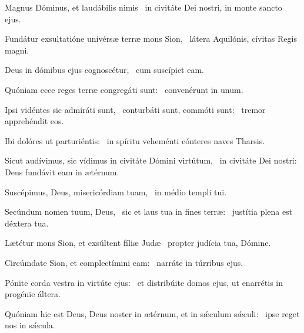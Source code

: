 \item Magnus Dóminus, et laudábilis nimis~\psstar{} in civitáte Dei nostri, in monte sancto ejus.

\item Fundátur exsultatióne univérsæ terræ mons Sion,~\psstar{} látera Aquilónis, cívitas Regis magni.

\item Deus in dómibus ejus cognoscétur,~\psstar{} cum suscípiet eam.

\item Quóniam ecce reges terræ congregáti sunt:~\psstar{} convenérunt in unum.

\item Ipsi vidéntes sic admiráti sunt,~\pscross{} conturbáti sunt, commóti sunt:~\psstar{} tremor apprehéndit eos.

\item Ibi dolóres ut parturiéntis:~\psstar{} in spíritu veheménti cónteres naves Tharsis.

\item Sicut audívimus, sic vídimus in civitáte Dómini virtútum,~\pscross{} in civitáte Dei nostri:~\psstar{} Deus fundávit eam in ætérnum.

\item Suscépimus, Deus, misericórdiam tuam,~\psstar{} in médio templi tui.

\item Secúndum nomen tuum, Deus,~\pscross{} sic et laus tua in fines terræ:~\psstar{} justítia plena est déxtera tua.

\item Lætétur mons Sion, et exsúltent fíliæ Judæ~\psstar{} propter judícia tua, Dómine.

\item Circúmdate Sion, et complectímini eam:~\psstar{} narráte in túrribus ejus.

\item Pónite corda vestra in virtúte ejus:~\psstar{} et distribúite domos ejus, ut enarrétis in progénie áltera.

\item Quóniam hic est Deus, Deus noster in ætérnum, et in sǽculum sǽculi:~\psstar{} ipse reget nos in sǽcula.
